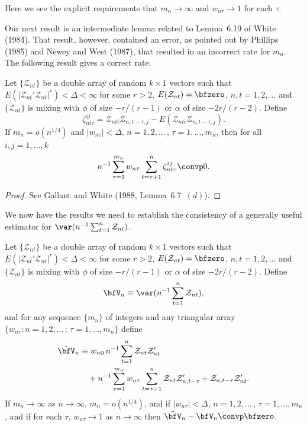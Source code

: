 Here we see the explicit requirements that $m_n \to \infty$ and $w_{n\tau} \to 1$ for each $\tau$.

Our next result is an intermediate lemma related to Lemma~6.19 of White (1984). That result, however, contained an error, as pointed out by Phillips (1985) and Newey and West (1987), that resulted in an incorrect rate for $m_n$. The following result gives a correct rate.

\begin{lemma}\label{lem:6.19}
Let $\{\mathcal{Z}_{nt}\}$ be a double array of random $k \times 1$ vectors such that $E(|\mathcal{Z}_{nt}'\mathcal{Z}_{nt}|^r) < \Delta < \infty$ for some $r > 2$, $E(\mathcal{Z}_{nt}) = \bfzero$, $n, t = 1,2,\ldots$ and $\{\mathcal{Z}_{nt}\}$ is mixing with $\phi$ of size $-r/(r-1)$ or $\alpha$ of size $-2r/(r-2)$. Define
\[
  \zeta_{nt\tau}^{ij} = \mathcal{Z}_{nti}\mathcal{Z}_{n,t-\tau,j} - E(\mathcal{Z}_{nti}\mathcal{Z}_{n,t-\tau,j}).
\]
If $m_n = o(n^{1/4})$ and $|w_{n\tau}| < \Delta$, $n = 1,2,\ldots$\,, $\tau = 1,\ldots,m_n$, then for all $i, j = 1,\ldots,k$
\[
  n^{-1}\sum_{\tau=1}^{m_n}w_{n\tau}\sum_{t=\tau+1}^{n}\zeta_{nt\tau}^{ij} \convp 0.
\]
\end{lemma}

\begin{proof}
See Gallant and White (1988, Lemma~6.7~$(d)$).
\end{proof}

We now have the results we need to establish the consistency of a generally useful estimator for $\var(n^{-1}\sum_{t=1}^{n}\mathcal{Z}_{nt})$.

\begin{theorem}\label{thm:6.20}
Let $\{\mathcal{Z}_{nt}\}$ be a double array of random $k \times 1$ vectors such that $E(|\mathcal{Z}_{nt}'\mathcal{Z}_{nt}|^r) < \Delta < \infty$ for some $r > 2$, $E(\mathcal{Z}_{nt}) = \bfzero$, $n, t = 1,2,\ldots$ and $\{\mathcal{Z}_{nt}\}$ is mixing with $\phi$ of size $-r/(r-1)$ or $\alpha$ of size $-2r/(r-2)$. Define
\[
  \bfV_n \equiv \var(n^{-1}\sum_{t=1}^{n}\mathcal{Z}_{nt}),
\]
and for any sequence $\{m_n\}$ of integers and any triangular array $\{w_{n\tau}: n = 1,2,\ldots\,;\,\tau = 1,\ldots,m_n\}$ define
\begin{align*}
  \tilde{\bfV}_n &\equiv w_{n0}\, n^{-1}\sum_{t=1}^{n}\mathcal{Z}_{nt}\mathcal{Z}_{nt}' \\
    &\quad + n^{-1}\sum_{\tau=1}^{m_n}w_{n\tau}\sum_{t=\tau+1}^{n}\mathcal{Z}_{nt}\mathcal{Z}_{n,t-\tau}' + \mathcal{Z}_{n,t-\tau}\mathcal{Z}_{nt}'.
\end{align*}
If $m_n \to \infty$ as $n \to \infty$, $m_n = o(n^{1/4})$, and if $|w_{n\tau}| < \Delta$, $n = 1,2,\ldots$\,, $\tau = 1,\ldots,m_n$, and if for each $\tau$, $w_{n\tau} \to 1$ as $n \to \infty$ then $\tilde{\bfV}_n - \bfV_n \convp \bfzero$.
\end{theorem}

